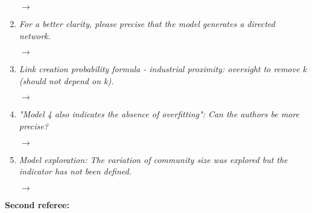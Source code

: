 \documentclass[10pt,a4paper,sans]{moderncv}        %
\begin{document}
\begin{enumerate}
	$\rightarrow$ 
	
	\medskip


	\item \textit{For a better clarity, please precise that the model generates a directed network.}
	
	$\rightarrow$ 
	
	\medskip

	\item \textit{Link creation probability formula - industrial proximity: oversight to remove k (should not depend on k).}
	
	$\rightarrow$ 
	
	\medskip

	\item \textit{"Model 4 also indicates the absence of overfitting": Can the authors be more precise?}

	$\rightarrow$ 
	
	\medskip

	\item \textit{Model exploration: The variation of community size was explored but the indicator has not been defined.}
	
	$\rightarrow$ 

\end{enumerate}


\bigskip
\bigskip


\textbf{Second referee:}

\medskip

\end{document}
